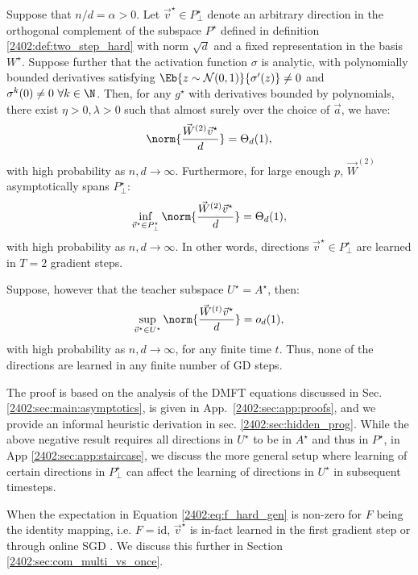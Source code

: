 \begin{theorem}
\label{2402:thm:main:2step_learning}
 Suppose that $n/d=\alpha>0$. Let $\vec{v}^\star\in P^\star_\perp$ denote an arbitrary direction in the orthogonal complement of the subspace $P^\star$ defined in definition \ref{2402:def:two_step_hard} with norm $\sqrt{d}$ and a fixed representation in the basis $W^\star$.
Suppose further that the activation function $\sigma$ is analytic, with polynomially bounded derivatives satisfying $\Eb{z \sim \mathcal{N}(0,1)}{\sigma'(z)} \neq 0$ and $\sigma^k(0) \neq 0  \ \forall k \in \N$. Then, for any $g^\star$ with derivatives bounded by polynomials, there exist $\eta> 0, \lambda > 0$ such that almost surely over the choice of $\vec{a}$, we have:
\begin{equation}
    \norm{\frac{\vec{W}^{(2)}\vec v^\star}{d}} = \Theta_d(1)  ,
\end{equation}
with high probability as $n,d \rightarrow \infty$. Furthermore, for large enough $p$, $\vec{W}^{(2)}$ asymptotically spans $P^\star_\perp$:
\begin{equation}
    \inf_{\vec v^\star \in P^\star_\perp}\norm{\frac{\vec{W}^{(2)}\vec v^\star}{d}} = \Theta_d(1) ,
\end{equation}
with high probability as $n,d \rightarrow \infty$.
In other words, directions $\vec v^\star \in P^\star_\perp$ are learned in $T=2$ gradient steps.  

Suppose, however that the teacher subspace $U^\star = A^\star$, then:
\begin{equation}
    \sup_{\vec v^\star \in U^\star} \norm{\frac{\vec{W}^{(t)} \vec v^\star}{d}} = o_d(1) ,
\end{equation}
with high probability as $n,d  \rightarrow  \infty$, for any finite time $t$. Thus, none of the directions are learned in any finite number of GD steps.
\end{theorem}
The proof is based on the analysis of the DMFT equations discussed
in Sec. \ref{2402:sec:main:asymptotics}, is given in App.~\ref{2402:sec:app:proofs}, and we provide an informal heuristic derivation in sec. \ref{2402:sec:hidden_prog}.
While the above negative result requires all directions in $U^\star$  to be in $A^\star$ and thus in $P^\star$, in App \ref{2402:sec:app:staircase}, we discuss the more general setup where learning of certain directions in $P^\star_\perp$ can affect the learning of directions in $U^\star$ in subsequent timesteps.

When the expectation in Equation \ref{2402:eq:f_hard_gen} is non-zero for $F$ being the identity mapping, i.e. $F = \mathrm{id}$, $\vec{v}^\star$ is in-fact learned in the first gradient step \citep{ba2022high,dandi2023how} or through online SGD \citep{arous2022high,abbe2023sgd}. We discuss this further in Section \ref{2402:sec:com_multi_vs_once}.

